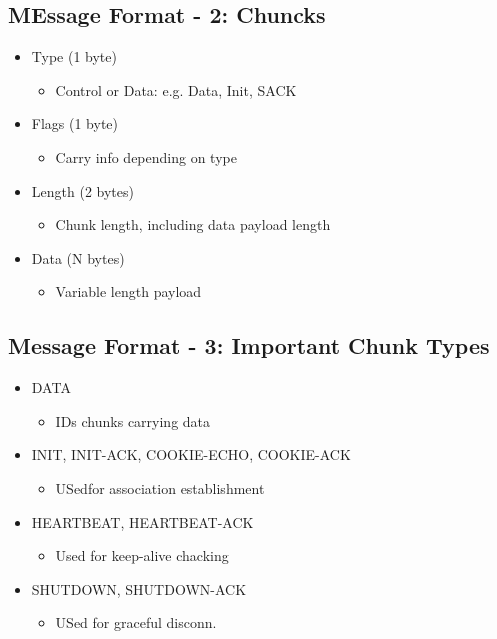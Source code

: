 \documentclass[a4paper]{article}
\begin{document}
\subsection{MEssage Format - 2: Chuncks}
\begin{itemize}
	\item Type (1 byte)
	\begin{itemize}
		\item Control or Data: e.g. Data, Init, SACK
	\end{itemize}
\item Flags (1 byte)
	\begin{itemize}
		\item Carry info depending on type
	\end{itemize}
\item Length (2 bytes)
	\begin{itemize}
		\item Chunk length, including data payload length
	\end{itemize}
\item Data (N bytes)
	\begin{itemize}
		\item Variable length payload
	\end{itemize}
\end{itemize}
\subsection{Message Format - 3: Important Chunk Types}
\begin{itemize}
	\item DATA
	\begin{itemize}
		\item IDs chunks carrying data
	\end{itemize}
	\item INIT, INIT-ACK, COOKIE-ECHO, COOKIE-ACK
	\begin{itemize}
		\item USedfor association establishment
	\end{itemize}
	\item HEARTBEAT, HEARTBEAT-ACK
	\begin{itemize}
		\item Used for keep-alive chacking
	\end{itemize}
	\item SHUTDOWN, SHUTDOWN-ACK
	\begin{itemize}
		\item USed for graceful disconn.
	\end{itemize}
\end{itemize}
\end{document}
